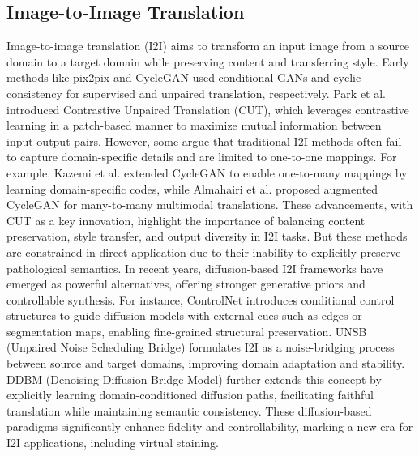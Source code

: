 \documentclass[journal,twoside,web]{ieeecolor}
\begin{document}
\subsection{Image-to-Image Translation}
Image-to-image translation (I2I) aims to transform an input image from a source domain to a target domain while preserving content and transferring style. Early methods like pix2pix \cite{isola2017image} and CycleGAN \cite{zhu2017unpaired} used conditional GANs and cyclic consistency for supervised and unpaired translation, respectively. Park et al. \cite{park2020contrastive} introduced Contrastive Unpaired Translation (CUT), which leverages contrastive learning in a patch-based manner to maximize mutual information between input-output pairs. However, some argue that traditional I2I methods often fail to capture domain-specific details and are limited to one-to-one mappings. For example, Kazemi et al. \cite{kazemi2018unsupervised}  extended CycleGAN to enable one-to-many mappings by learning domain-specific codes, while Almahairi et al. \cite{cyclegan2018learning} proposed augmented CycleGAN for many-to-many multimodal translations. These advancements, with CUT as a key innovation, highlight the importance of balancing content preservation, style transfer, and output diversity in I2I tasks. But these methods are constrained in direct application due to their inability to explicitly preserve pathological semantics.
{In recent years, diffusion-based I2I frameworks have emerged as powerful alternatives, offering stronger generative priors and controllable synthesis. For instance, ControlNet \cite{zhang2023adding} introduces conditional control structures to guide diffusion models with external cues such as edges or segmentation maps, enabling fine-grained structural preservation. UNSB (Unpaired Noise Scheduling Bridge) \cite{kim2023unpaired} formulates I2I as a noise-bridging process between source and target domains, improving domain adaptation and stability. DDBM (Denoising Diffusion Bridge Model) \cite{zhou2023denoising} further extends this concept by explicitly learning domain-conditioned diffusion paths, facilitating faithful translation while maintaining semantic consistency. These diffusion-based paradigms significantly enhance fidelity and controllability, marking a new era for I2I applications, including virtual staining.}
 
\end{document}

